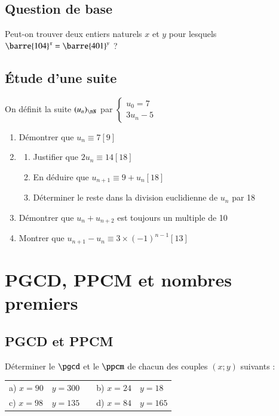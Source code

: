 \documentclass[oneside,12pt]{article}          %
\begin{document}
\subsection{Question de base}

Peut-on trouver deux entiers naturels $x$ et $y$ pour lesquels $\barre{104}^x=\barre{401}^y$ ?



\subsection{Étude d'une suite}
On définit la suite $(u_n)_{\nN}$ par $\begin{cases}u_0=7\\3u_n-5\end{cases}$
\begin{enumerate}
	\item Démontrer que $u_n\equiv7[9]$
	\item\begin{enumerate}
		\item Justifier que $2u_n\equiv14[18]$
		\item En déduire que $u_{n+1}\equiv9+u_n[18]$
		\item Déterminer le reste dans la division euclidienne de $u_n$ par 18
	\end{enumerate}
	\item Démontrer que $u_n+u_{n+2}$ est toujours un multiple de 10
	\item Montrer que $u_{n+1}-u_n\equiv3\times(-1)^{n-1}[13]$
\end{enumerate}



\section{PGCD, PPCM et nombres premiers}

\subsection{PGCD et PPCM}
Déterminer le $\pgcd$ et le $\ppcm$ de chacun des couples $(x;y)$ suivants :

\begin{tabular}{p{20mm}p{35mm}|p{15mm}p{30mm}p{30mm}}
     a) $x=90$ & $y=300$ & & b) $x=24$ & $y=18$ \\
     c) $x=98$ & $y=135$ & & d) $x=84$ & $y=165$
\end{tabular}
\end{document}
